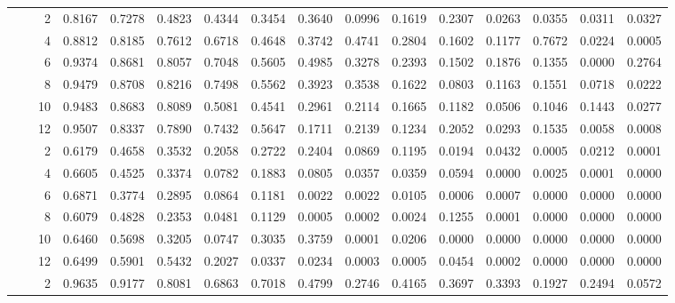 \documentclass[
  12pt]{article}
\begin{document}
\begin{longtable}[t]{rrrrrrrrrrrrrrrr}
\endfoot
\bottomrule
\endlastfoot
 &  & 2 & 0.8167 & 0.7278 & 0.4823 & 0.4344 & 0.3454 & 0.3640 & 0.0996 & 0.1619 & 0.2307 & 0.0263 & 0.0355 & 0.0311 & 0.0327\\
\cmidrule{3-16}\nopagebreak
 &  & 4 & 0.8812 & 0.8185 & 0.7612 & 0.6718 & 0.4648 & 0.3742 & 0.4741 & 0.2804 & 0.1602 & 0.1177 & 0.7672 & 0.0224 & 0.0005\\
\cmidrule{3-16}\nopagebreak
 &  & 6 & 0.9374 & 0.8681 & 0.8057 & 0.7048 & 0.5605 & 0.4985 & 0.3278 & 0.2393 & 0.1502 & 0.1876 & 0.1355 & 0.0000 & 0.2764\\
\cmidrule{3-16}\nopagebreak
 &  & 8 & 0.9479 & 0.8708 & 0.8216 & 0.7498 & 0.5562 & 0.3923 & 0.3538 & 0.1622 & 0.0803 & 0.1163 & 0.1551 & 0.0718 & 0.0222\\
\cmidrule{3-16}\nopagebreak
 &  & 10 & 0.9483 & 0.8683 & 0.8089 & 0.5081 & 0.4541 & 0.2961 & 0.2114 & 0.1665 & 0.1182 & 0.0506 & 0.1046 & 0.1443 & 0.0277\\
\cmidrule{3-16}\nopagebreak
 & \multirow{-6}{*}{\raggedleft\arraybackslash 1} & 12 & 0.9507 & 0.8337 & 0.7890 & 0.7432 & 0.5647 & 0.1711 & 0.2139 & 0.1234 & 0.2052 & 0.0293 & 0.1535 & 0.0058 & 0.0008\\
\cmidrule{2-16}\nopagebreak
 &  & 2 & 0.6179 & 0.4658 & 0.3532 & 0.2058 & 0.2722 & 0.2404 & 0.0869 & 0.1195 & 0.0194 & 0.0432 & 0.0005 & 0.0212 & 0.0001\\
\cmidrule{3-16}\nopagebreak
 &  & 4 & 0.6605 & 0.4525 & 0.3374 & 0.0782 & 0.1883 & 0.0805 & 0.0357 & 0.0359 & 0.0594 & 0.0000 & 0.0025 & 0.0001 & 0.0000\\
\cmidrule{3-16}\nopagebreak
 &  & 6 & 0.6871 & 0.3774 & 0.2895 & 0.0864 & 0.1181 & 0.0022 & 0.0022 & 0.0105 & 0.0006 & 0.0007 & 0.0000 & 0.0000 & 0.0000\\
\cmidrule{3-16}\nopagebreak
 &  & 8 & 0.6079 & 0.4828 & 0.2353 & 0.0481 & 0.1129 & 0.0005 & 0.0002 & 0.0024 & 0.1255 & 0.0001 & 0.0000 & 0.0000 & 0.0000\\
\cmidrule{3-16}\nopagebreak
 &  & 10 & 0.6460 & 0.5698 & 0.3205 & 0.0747 & 0.3035 & 0.3759 & 0.0001 & 0.0206 & 0.0000 & 0.0000 & 0.0000 & 0.0000 & 0.0000\\
\cmidrule{3-16}\nopagebreak
 & \multirow{-6}{*}{\raggedleft\arraybackslash 2} & 12 & 0.6499 & 0.5901 & 0.5432 & 0.2027 & 0.0337 & 0.0234 & 0.0003 & 0.0005 & 0.0454 & 0.0002 & 0.0000 & 0.0000 & 0.0000\\
\cmidrule{2-16}\nopagebreak
 &  & 2 & 0.9635 & 0.9177 & 0.8081 & 0.6863 & 0.7018 & 0.4799 & 0.2746 & 0.4165 & 0.3697 & 0.3393 & 0.1927 & 0.2494 & 0.0572\\

\end{longtable}
\end{document}
